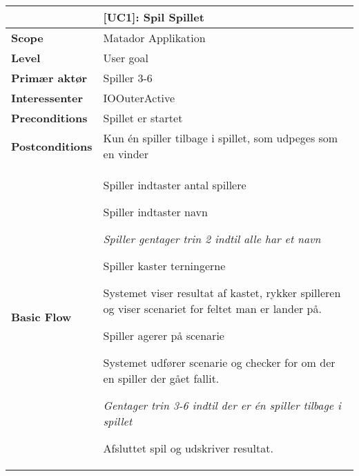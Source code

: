 \documentclass[class=article, crop=false]{standalone}
\makeatletter
\let\savespace\@minipagetrue
\makeatother
\begin{document}
    \begin{table}[H]
        \begin{tabularx}{\textwidth}{|l|X|}
            \hline
                                         & \textbf{[UC1]: Spil Spillet}   \\ \hline
            \textbf{Scope}               & Matador Applikation\\ \hline
            \textbf{Level}               & User goal     \\ \hline
            \textbf{Primær aktør}        & Spiller 3-6   \\ \hline
            \textbf{Interessenter}       & IOOuterActive\\ \hline
            \textbf{Preconditions}       & Spillet er startet \\ \hline
            \textbf{Postconditions}      & Kun én spiller tilbage i spillet,
                                           som udpeges som en vinder\\ \hline





            \textbf{Basic Flow} & \begin{tabenum}
                                  \item Spiller indtaster antal spillere
                                  \item Spiller indtaster navn
                                      \savespace
                                        \begin{compactitem}
                                            \item \textit{Spiller gentager trin 2                                                             indtil alle har et navn}
                                  \end{compactitem}
                                      \item Spiller kaster terningerne
                                      \item Systemet viser resultat af kastet, rykker spilleren og viser scenariet for feltet man er lander på.
                                      \item Spiller agerer på scenarie
                                      \item Systemet udfører scenarie og checker for om der en spiller der gået fallit.
                                  \savespace
                                  \begin{compactitem}
                                      \item \textit{Gentager trin 3-6 indtil der er én spiller tilbage i spillet}
                                  \end{compactitem}
                                      \item Afsluttet spil og udskriver resultat.
                                   \end{tabenum}   \\ \hline





\end{tabularx}
\end{table}
\end{document}
